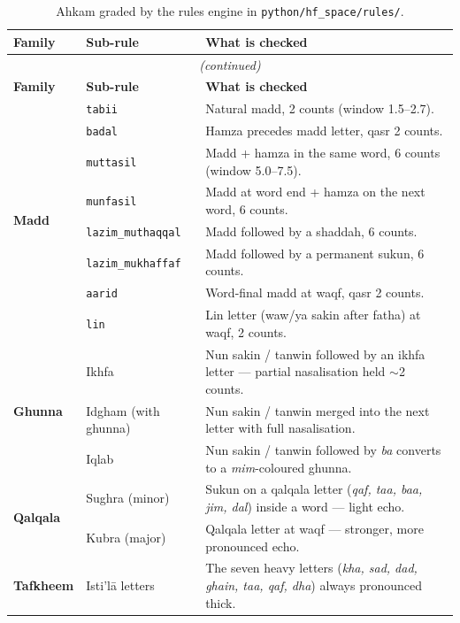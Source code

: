 \begin{longtable}{p{2.6cm} p{4.2cm} p{7.4cm}}
\caption{Ahkam graded by the rules engine in \texttt{python/hf\_space/rules/}.}
\label{tab:app_ahkam} \\
\toprule
\textbf{Family} & \textbf{Sub-rule} & \textbf{What is checked} \\
\midrule
\endfirsthead
\multicolumn{3}{c}{\textit{(continued)}} \\
\toprule
\textbf{Family} & \textbf{Sub-rule} & \textbf{What is checked} \\
\midrule
\endhead

\multirow{8}{*}{\textbf{Madd}}
  & \texttt{tabii}            & Natural madd, 2 counts (window 1.5--2.7). \\
  & \texttt{badal}            & Hamza precedes madd letter, qasr 2 counts. \\
  & \texttt{muttasil}         & Madd + hamza in the same word, 6 counts (window 5.0--7.5). \\
  & \texttt{munfasil}         & Madd at word end + hamza on the next word, 6 counts. \\
  & \texttt{lazim\_muthaqqal} & Madd followed by a shaddah, 6 counts. \\
  & \texttt{lazim\_mukhaffaf} & Madd followed by a permanent sukun, 6 counts. \\
  & \texttt{aarid}            & Word-final madd at waqf, qasr 2 counts. \\
  & \texttt{lin}              & Lin letter (waw/ya sakin after fatha) at waqf, 2 counts. \\
\midrule
\multirow{3}{*}{\textbf{Ghunna}}
  & Ikhfa                     & Nun sakin / tanwin followed by an ikhfa letter --- partial nasalisation held $\sim$2 counts. \\
  & Idgham (with ghunna)      & Nun sakin / tanwin merged into the next letter with full nasalisation. \\
  & Iqlab                     & Nun sakin / tanwin followed by \emph{ba} converts to a \emph{mim}-coloured ghunna. \\
\midrule
\multirow{2}{*}{\textbf{Qalqala}}
  & Sughra (minor)            & Sukun on a qalqala letter (\emph{qaf, taa, baa, jim, dal}) inside a word --- light echo. \\
  & Kubra (major)             & Qalqala letter at waqf --- stronger, more pronounced echo. \\
\midrule
\multirow{3}{*}{\textbf{Tafkheem}}
  & Isti'l\=a letters         & The seven heavy letters (\emph{kha, sad, dad, ghain, taa, qaf, dha}) always pronounced thick. \\

\end{longtable}
